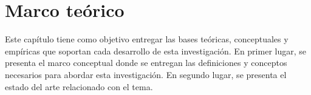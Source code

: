 
\chapter{Marco teórico}
\label{chp:marco_teorico}
Este capítulo tiene como objetivo entregar las bases teóricas, conceptuales y empíricas que soportan cada desarrollo de esta investigación. En primer lugar, se presenta el marco conceptual donde se entregan las definiciones y conceptos necesarios para abordar esta investigación. En segundo lugar, se presenta el estado del arte relacionado con el tema.





